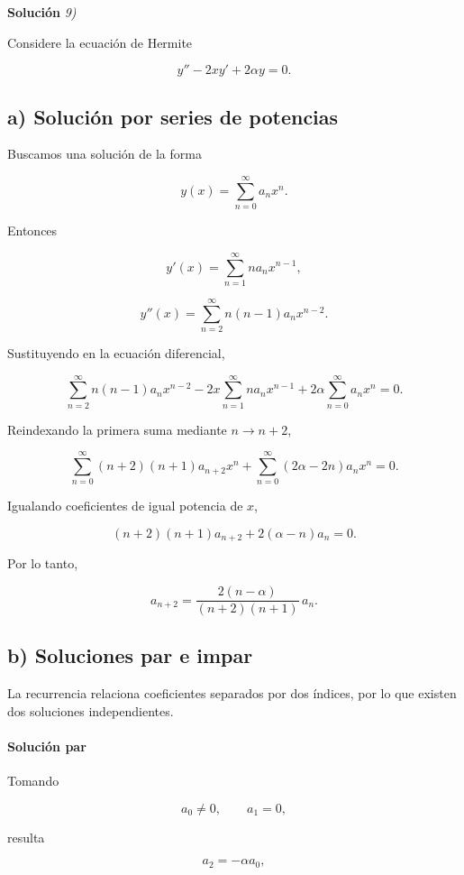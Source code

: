 \documentclass[11pt,spanish]{article}
\begin{document}
\vspace{0.5cm}
{\bf Soluci\'on }{\em 9)}
\vspace{0.5cm}

Considere la ecuación de Hermite

\[
y''-2xy'+2\alpha y=0.
\]

\subsection*{a) Solución por series de potencias}

Buscamos una solución de la forma

\[
y(x)=\sum_{n=0}^{\infty} a_n x^n.
\]

Entonces

\[
y'(x)=\sum_{n=1}^{\infty} n a_n x^{n-1},
\]

\[
y''(x)=\sum_{n=2}^{\infty} n(n-1)a_n x^{n-2}.
\]

Sustituyendo en la ecuación diferencial,

\[
\sum_{n=2}^{\infty} n(n-1)a_n x^{n-2}
-2x\sum_{n=1}^{\infty} n a_n x^{n-1}
+2\alpha \sum_{n=0}^{\infty} a_n x^n
=0.
\]

Reindexando la primera suma mediante \(n\to n+2\),

\[
\sum_{n=0}^{\infty}
(n+2)(n+1)a_{n+2}x^n
+
\sum_{n=0}^{\infty}
(2\alpha-2n)a_nx^n
=0.
\]

Igualando coeficientes de igual potencia de \(x\),

\[
(n+2)(n+1)a_{n+2}
+
2(\alpha-n)a_n
=
0.
\]

Por lo tanto,

\[
\boxed{
a_{n+2}
=
\frac{2(n-\alpha)}
     {(n+2)(n+1)}
\,a_n.
}
\]

\subsection*{b) Soluciones par e impar}

La recurrencia relaciona coeficientes separados por dos índices, por lo que existen dos soluciones independientes.

\paragraph{Solución par}

Tomando

\[
a_0\neq 0,
\qquad
a_1=0,
\]

resulta

\[
a_2=-\alpha a_0,
\]
\end{document}
